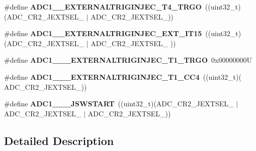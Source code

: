 \begin{DoxyCompactItemize}
\#define {\bfseries A\+D\+C1\+\_\+\_\+\+E\+X\+T\+E\+R\+N\+A\+L\+T\+R\+I\+G\+I\+N\+J\+E\+C\+\_\+\+T4\+\_\+\+T\+R\+GO}~((uint32\+\_\+t)(A\+D\+C\+\_\+\+C\+R2\+\_\+\+J\+E\+X\+T\+S\+E\+L\+\_ $\vert$                     A\+D\+C\+\_\+\+C\+R2\+\_\+\+J\+E\+X\+T\+S\+E\+L\+\_))
\item 
\mbox{\label{group___a_d_c_ex___internal___h_a_l__driver___ext__trig__src___injected_gadc93f600922a5ac31095985021bf6d1e}} 
\#define {\bfseries A\+D\+C1\+\_\+\_\+\+E\+X\+T\+E\+R\+N\+A\+L\+T\+R\+I\+G\+I\+N\+J\+E\+C\+\_\+\+E\+X\+T\+\_\+\+I\+T15}~((uint32\+\_\+t)(A\+D\+C\+\_\+\+C\+R2\+\_\+\+J\+E\+X\+T\+S\+E\+L\+\_ $\vert$ A\+D\+C\+\_\+\+C\+R2\+\_\+\+J\+E\+X\+T\+S\+E\+L\+\_                    ))
\item 
\mbox{\label{group___a_d_c_ex___internal___h_a_l__driver___ext__trig__src___injected_gab6817ea69f541312caf700f5fce6c3df}} 
\#define {\bfseries A\+D\+C1\+\_\+\_\+\_\+\+E\+X\+T\+E\+R\+N\+A\+L\+T\+R\+I\+G\+I\+N\+J\+E\+C\+\_\+\+T1\+\_\+\+T\+R\+GO}~0x00000000U
\item 
\mbox{\label{group___a_d_c_ex___internal___h_a_l__driver___ext__trig__src___injected_ga1db720110f19771a0c966dd1b0452f0c}} 
\#define {\bfseries A\+D\+C1\+\_\+\_\+\_\+\+E\+X\+T\+E\+R\+N\+A\+L\+T\+R\+I\+G\+I\+N\+J\+E\+C\+\_\+\+T1\+\_\+\+C\+C4}~((uint32\+\_\+t)(                                        A\+D\+C\+\_\+\+C\+R2\+\_\+\+J\+E\+X\+T\+S\+E\+L\+\_))
\item 
\mbox{\label{group___a_d_c_ex___internal___h_a_l__driver___ext__trig__src___injected_ga1ef7968c844aa0205793b4b52e8dbb7c}} 
\#define {\bfseries A\+D\+C1\+\_\+\_\+\_\+\+J\+S\+W\+S\+T\+A\+RT}~((uint32\+\_\+t)(A\+D\+C\+\_\+\+C\+R2\+\_\+\+J\+E\+X\+T\+S\+E\+L\+\_ $\vert$ A\+D\+C\+\_\+\+C\+R2\+\_\+\+J\+E\+X\+T\+S\+E\+L\+\_ $\vert$ A\+D\+C\+\_\+\+C\+R2\+\_\+\+J\+E\+X\+T\+S\+E\+L\+\_))
\end{DoxyCompactItemize}


\subsection{Detailed Description}
